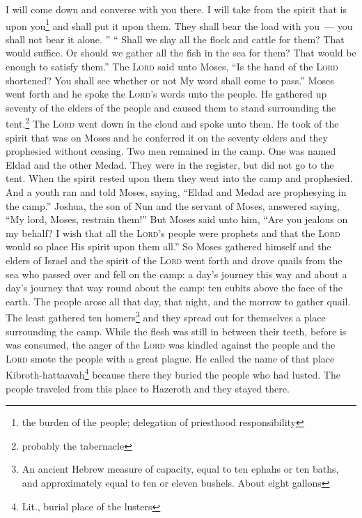 \begin{enumerate}
     I will come down and converse with you there. I will take from the spirit that is upon you\footnote{the burden of the people; delegation of priesthood responsibility} and shall put it upon them. They shall bear the load with you~--- you shall not bear it alone.%
     ''%
     ``%
     Shall we slay all the flock and cattle for them? That would suffice. Or should we gather all the fish in the sea for them? That would be enough to satisfy them.''%
     The \textsc{Lord} said unto Moses, ``Is the hand of the \textsc{Lord} shortened? You shall see whether or not My word shall come to pass.''%
     Moses went forth and he spoke the \textsc{Lord}'s words unto the people. He gathered up seventy of the elders of the people and caused them to stand surrounding the tent.\footnote{probably the tabernacle}%
     The \textsc{Lord} went down in the cloud and spoke unto them. He took of the spirit that was on Moses and he conferred it on the seventy elders and they prophesied without ceasing.%
     Two men remained in the camp. One was named Eldad and the other Medad. They were in the register, but did not go to the tent. When the spirit rested upon them they went into the camp and prophesied.%
     And a youth ran and told Moses, saying, ``Eldad and Medad are prophesying in the camp.''%
     Joshua, the son of Nun and the servant of Moses, answered saying, ``My lord, Moses, restrain them!''%
     But Moses said unto him, ``Are you jealous on my behalf? I wish that all the \textsc{Lord}'s people were prophets and that the \textsc{Lord} would so place His spirit upon them all.''%
     So Moses gathered himself and the elders of Israel%
     and the spirit of the \textsc{Lord} went forth and drove quails from the sea who passed over and fell on the camp: a day's journey this way and about a day's journey that way round about the camp: ten cubits above the face of the earth.%
     The people arose all that day, that night, and the morrow to gather quail. The least gathered ten homers\footnote{An ancient Hebrew measure of capacity, equal to ten ephahs or ten baths, and approximately equal to ten or eleven bushels. About eight gallons} and they spread out for themselves a place surrounding the camp.%
     While the flesh was still in between their teeth, before is was consumed, the anger of the \textsc{Lord} was kindled against the people and the \textsc{Lord} smote the people with a great plague.%
     He called the name of that place Kibroth-hattaavah\footnote{Lit., burial place of the lusters} because there they buried the people who had lusted.%
     The people traveled from this place to Hazeroth and they stayed there.%
\end{enumerate}

